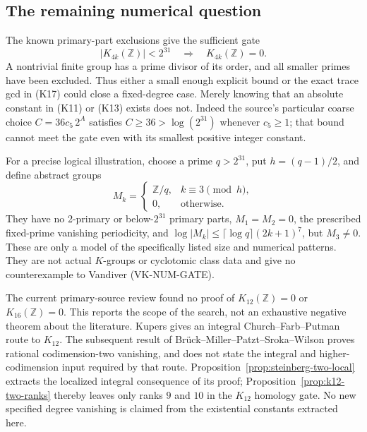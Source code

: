 \subsection{The remaining numerical question}

The known primary-part exclusions give the sufficient gate
\[
 |K_{4k}(\mathbb Z)|<2^{31}
 \quad\Longrightarrow\quad K_{4k}(\mathbb Z)=0.       \tag{K22}
\]
A nontrivial finite group has a prime divisor of its order,
and all smaller primes have been excluded. Thus either a
small enough explicit bound or the exact trace gcd in
(K17) could close a fixed-degree case. Merely knowing that
an absolute constant in (K11) or (K13) exists does not.
Indeed the source's particular coarse choice
\(C=36c_5\,2^A\) satisfies \(C\ge36>\log(2^{31})\)
whenever \(c_5\ge1\); that bound cannot meet the gate even
with its smallest positive integer constant.

For a precise logical illustration, choose a prime
\(q>2^{31}\), put \(h=(q-1)/2\), and define abstract groups
\[
 M_k=
 \begin{cases}
 \mathbb Z/q,& k\equiv3\pmod h,\\
 0,&\text{otherwise}.
 \end{cases}
\]
They have no 2-primary or below-\(2^{31}\) primary parts,
\(M_1=M_2=0\), the prescribed fixed-prime vanishing
periodicity, and
\(\log|M_k|\le\lceil\log q\rceil(2k+1)^7\), but
\(M_3\ne0\). These are only a model of the specifically
listed size and numerical patterns. They are not actual
\(K\)-groups or cyclotomic class data and give no
counterexample to Vandiver (VK-NUM-GATE).

The current primary-source review found no proof of
\(K_{12}(\mathbb Z)=0\) or \(K_{16}(\mathbb Z)=0\).
This reports the scope of the search, not an exhaustive
negative theorem about the literature.
Kupers \cite[Remark~2.6, p.~4]{Kupers2019} gives an
integral Church--Farb--Putman route to \(K_{12}\).
The subsequent result of Br\"uck--Miller--Patzt--Sroka--Wilson
\cite[Theorem~B]{BrueckEtAl2024} proves rational
codimension-two vanishing, and does not state the integral
and higher-codimension input required by that route.
Proposition~\ref{prop:steinberg-two-local} extracts the localized
integral consequence of its proof; Proposition~\ref{prop:k12-two-ranks}
thereby leaves only ranks $9$ and $10$ in the $K_{12}$ homology gate.
No new specified degree vanishing is claimed from the
existential constants extracted here.
